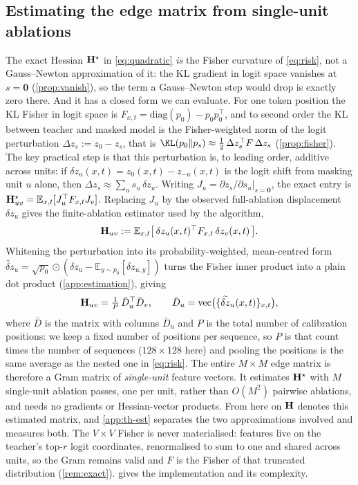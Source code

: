 \subsection{Estimating the edge matrix from single-unit ablations}
\label{sec:method-estimate}

The exact Hessian $\mathbf{H}^\star$ in \cref{eq:quadratic} \emph{is} the Fisher curvature of \cref{eq:risk}, not a
Gauss--Newton approximation of it: the KL gradient in logit space vanishes at $s=\mathbf 0$
(\cref{prop:vanish}), so the term a Gauss--Newton step would drop is exactly zero there. And it has a
closed form we can evaluate. For one token position the KL Fisher in logit space is
$F_{x,t}=\mathrm{diag}(p_0)-p_0 p_0^\top$, and to second order the KL between teacher and masked model is the Fisher-weighted norm of the logit
perturbation $\Delta z_s:=z_0-z_s$, that is $\KL(p_0\|p_s)\approx\tfrac12\,\Delta z_s^\top F\,\Delta z_s$
(\cref{prop:fisher}). The key practical step is that this perturbation is, to leading order,
additive across units: if $\delta z_u(x,t)=z_0(x,t)-z_{-u}(x,t)$ is the logit shift from
masking unit $u$ alone, then $\Delta z_s\approx\sum_u s_u\,\delta z_u$. Writing
$J_u=\partial z_s/\partial s_u|_{s=\mathbf 0}$, the exact entry is
$\mathbf{H}^\star_{uv}=\mathbb E_{x,t}[J_u^\top F_{x,t}J_v]$. Replacing $J_u$ by the observed
full-ablation displacement $\delta z_u$ gives the finite-ablation estimator used by the algorithm,
\begin{equation}
\mathbf{H}_{uv}:=\mathbb{E}_{x,t}\big[\,\delta z_u(x,t)^\top F_{x,t}\,\delta z_v(x,t)\,\big].
\label{eq:huv}
\end{equation}
Whitening the perturbation into its probability-weighted, mean-centred form
$\widetilde{\delta z}_u=\sqrt{p_0}\odot(\delta z_u-\mathbb{E}_{y\sim p_0}[\delta z_{u,y}])$ turns the
Fisher inner product into a plain dot product (\cref{app:estimation}), giving
\begin{equation}
\mathbf{H}_{uv}=\tfrac{1}{P}\,\bar{D}_u^\top \bar{D}_v,
\qquad \bar{D}_u=\mathrm{vec}\big(\{\widetilde{\delta z}_u(x,t)\}_{x,t}\big),
\label{eq:gram}
\end{equation}
where $\bar D$ is the matrix with columns $\bar D_u$ and $P$ is the total number of calibration
positions: we keep a fixed number of positions per sequence, so $P$ is that count times the number of
sequences ($128\times128$ here) and pooling the positions is the same average as the nested one in
\cref{eq:risk}. The entire $M\times M$ edge matrix is therefore a Gram matrix of \emph{single-unit}
feature vectors. It estimates $\mathbf{H}^\star$ with $M$ single-unit ablation passes, one per unit, rather than $O(M^2)$ pairwise
ablations, and needs no gradients or Hessian-vector products. From here on $\mathbf{H}$ denotes this
estimated matrix, and
\cref{app:th-est} separates the two approximations involved and measures both. The $V\times V$ Fisher is never materialised: features live on the teacher's top-$r$ logit
coordinates, renormalised to sum to one and shared across units, so the Gram remains valid and $F$ is
the Fisher of that truncated distribution (\cref{rem:exact}).
 gives the implementation and its complexity.

